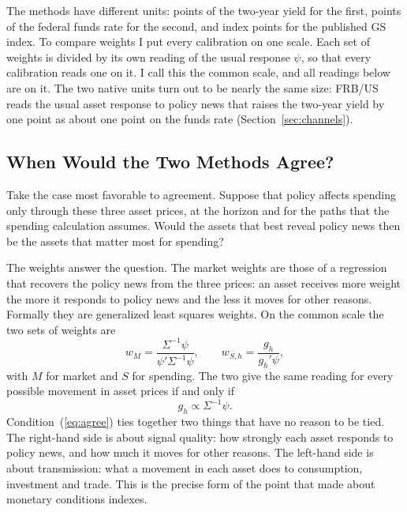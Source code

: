 The methods have different units: points of the two-year yield for the first, points of the federal funds rate for the second, and index points for the published GS index. To compare weights I put every calibration on one scale. Each set of weights is divided by its own reading of the usual response $\psi$, so that every calibration reads one on it. I call this the common scale, and all readings below are on it. The two native units turn out to be nearly the same size: FRB/US reads the usual asset response to policy news that raises the two-year yield by one point as about one point on the funds rate (Section~\ref{sec:channels}).

\subsection{When Would the Two Methods Agree?}\label{sec:why}
Take the case most favorable to agreement. Suppose that policy affects spending only through these three asset prices, at the horizon and for the paths that the spending calculation assumes. Would the assets that best reveal policy news then be the assets that matter most for spending?

The weights answer the question. The market weights are those of a regression that recovers the policy news from the three prices: an asset receives more weight the more it responds to policy news and the less it moves for other reasons. Formally they are generalized least squares weights. On the common scale the two sets of weights are
\begin{equation}\label{eq:weights}
w_M=\frac{\Sigma^{-1}\psi}{\psi'\Sigma^{-1}\psi},
\qquad
w_{S,h}=\frac{g_h}{g_h'\psi},
\end{equation}
with $M$ for market and $S$ for spending. The two give the same reading for every possible movement in asset prices if and only if
\begin{equation}\label{eq:agree}
g_h\propto\Sigma^{-1}\psi .
\end{equation}
Condition~(\ref{eq:agree}) ties together two things that have no reason to be tied. The right-hand side is about signal quality: how strongly each asset responds to policy news, and how much it moves for other reasons. The left-hand side is about transmission: what a movement in each asset does to consumption, investment and trade. This is the precise form of the point that \citet{eika1996} made about monetary conditions indexes.

